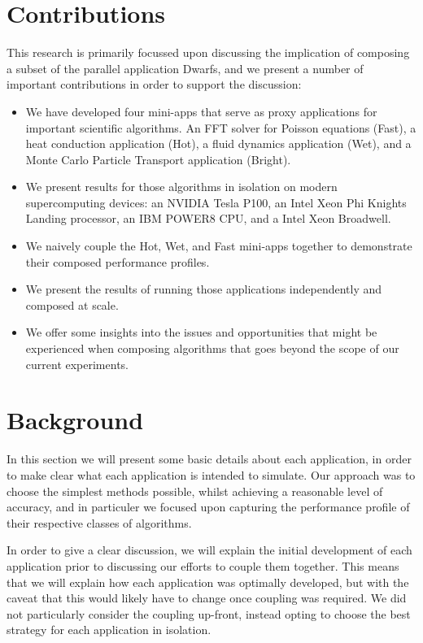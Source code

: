 \documentclass[runningheads,a4paper]{llncs}
\begin{document}
\section{Contributions}

This research is primarily focussed upon discussing the implication of composing a subset of the parallel application Dwarfs, and we present a number of important contributions in order to support the discussion:

\begin{itemize}
  \item We have developed four mini-apps that serve as proxy applications for important scientific algorithms. An FFT solver for Poisson equations (Fast), a heat conduction application (Hot), a fluid dynamics application (Wet), and a Monte Carlo Particle Transport application (Bright).

  \item We present results for those algorithms in isolation on modern supercomputing devices: an NVIDIA Tesla P100, an Intel Xeon Phi Knights Landing processor, an IBM POWER8 CPU, and a Intel Xeon Broadwell.

  \item We naively couple the Hot, Wet, and Fast mini-apps together to demonstrate their composed performance profiles.

  \item We present the results of running those applications independently and composed at scale.

  \item We offer some insights into the issues and opportunities that might be experienced when composing algorithms that goes beyond the scope of our current experiments.

\end{itemize}

\section{Background}

In this section we will present some basic details about each application, in order to make clear what each application is intended to simulate. Our approach was to choose the simplest methods possible, whilst achieving a reasonable level of accuracy, and in particuler we focused upon capturing the performance profile of their respective classes of algorithms.

In order to give a clear discussion, we will explain the initial development of each application prior to discussing our efforts to couple them together. This means that we will explain how each application was optimally developed, but with the caveat that this would likely have to change once coupling was required. We did not particularly consider the coupling up-front, instead opting to choose the best strategy for each application in isolation.
\end{document}
